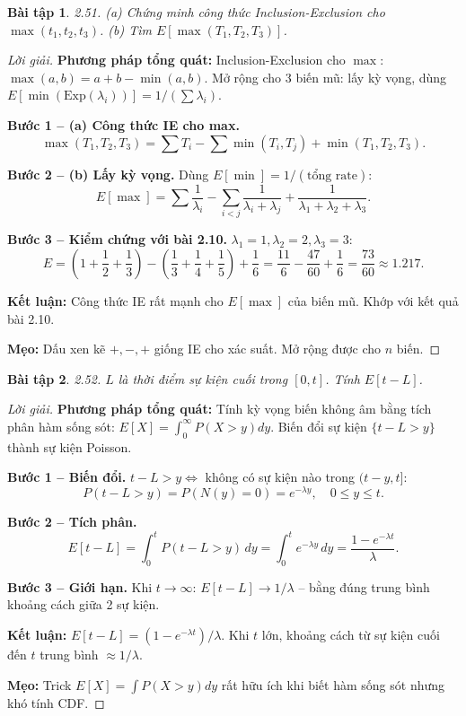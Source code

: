 \documentclass[8pt,a4paper]{article}
\newtheorem{exercise}{Bài tập}
\newenvironment{solution}{\begin{proof}[Lời giải]}{\end{proof}}
\begin{document}
\begin{exercise}
2.51. (a) Chứng minh công thức Inclusion-Exclusion cho $\max(t_1, t_2, t_3)$. (b) Tìm $E[\max(T_1, T_2, T_3)]$.
\end{exercise}
\begin{solution}
\textbf{Phương pháp tổng quát:} Inclusion-Exclusion cho $\max$: $\max(a,b) = a+b-\min(a,b)$. Mở rộng cho 3 biến mũ: lấy kỳ vọng, dùng $E[\min(\text{Exp}(\lambda_i))] = 1/(\sum \lambda_i)$.

\textbf{Bước 1 -- (a) Công thức IE cho max.}
\[
  \max(T_1, T_2, T_3) = \sum T_i - \sum \min(T_i, T_j) + \min(T_1, T_2, T_3).
\]

\textbf{Bước 2 -- (b) Lấy kỳ vọng.} Dùng $E[\min] = 1/(\text{tổng rate})$:
\[
  \boxed{E[\max] = \sum \frac{1}{\lambda_i} - \sum_{i<j} \frac{1}{\lambda_i+\lambda_j} + \frac{1}{\lambda_1+\lambda_2+\lambda_3}}.
\]

\textbf{Bước 3 -- Kiểm chứng với bài 2.10.} $\lambda_1 = 1, \lambda_2 = 2, \lambda_3 = 3$:
\[
  E = \left(1 + \frac{1}{2} + \frac{1}{3}\right) - \left(\frac{1}{3} + \frac{1}{4} + \frac{1}{5}\right) + \frac{1}{6} = \frac{11}{6} - \frac{47}{60} + \frac{1}{6} = \boxed{\frac{73}{60} \approx 1.217}.
\]

\textbf{Kết luận:} Công thức IE rất mạnh cho $E[\max]$ của biến mũ. Khớp với kết quả bài 2.10.

\textbf{Mẹo:} Dấu xen kẽ $+, -, +$ giống IE cho xác suất. Mở rộng được cho $n$ biến.
\end{solution}

\begin{exercise}
2.52. $L$ là thời điểm sự kiện cuối trong $[0, t]$. Tính $E[t-L]$.
\end{exercise}
\begin{solution}
\textbf{Phương pháp tổng quát:} Tính kỳ vọng biến không âm bằng tích phân hàm sống sót: $E[X] = \int_0^\infty P(X > y) dy$. Biến đổi sự kiện $\{t-L > y\}$ thành sự kiện Poisson.

\textbf{Bước 1 -- Biến đổi.} $t - L > y \Leftrightarrow$ không có sự kiện nào trong $(t-y, t]$:
\[
  P(t-L > y) = P(N(y) = 0) = e^{-\lambda y}, \quad 0 \leq y \leq t.
\]

\textbf{Bước 2 -- Tích phân.}
\[
  E[t-L] = \int_0^t P(t-L > y) \, dy = \int_0^t e^{-\lambda y} \, dy = \boxed{\frac{1-e^{-\lambda t}}{\lambda}}.
\]

\textbf{Bước 3 -- Giới hạn.} Khi $t \to \infty$: $E[t-L] \to 1/\lambda$ -- bằng đúng trung bình khoảng cách giữa 2 sự kiện.

\textbf{Kết luận:} $E[t-L] = (1-e^{-\lambda t})/\lambda$. Khi $t$ lớn, khoảng cách từ sự kiện cuối đến $t$ trung bình $\approx 1/\lambda$.

\textbf{Mẹo:} Trick $E[X] = \int P(X>y) dy$ rất hữu ích khi biết hàm sống sót nhưng khó tính CDF.
\end{solution}
\end{document}
